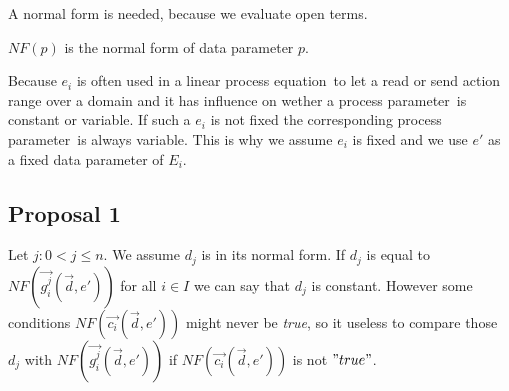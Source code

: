 \documentclass[a4paper,10pt]{article}
\newcommand{\lpe}{linear process equation}
\newcommand{\ovr}{\overrightarrow}
\newcommand{\pp}{process parameter}
\newcommand{\pps}{process parameters}
\newcommand{\ti}{\textit}
\begin{document}
A normal form is needed, because we evaluate open terms. 
\begin{defn} 
$NF(p)$ is the normal form of data parameter $p$. 
\end{defn}



Because $e_i$ is often used in a \lpe\ to let a read or send action range over a domain and it has influence on wether a \pp\ is constant or variable. If such a $e_i$ is not fixed the corresponding \pp\ is always variable.  This is why we assume $e_i$ is fixed and we use $e'$ as a fixed data parameter of $E_i$.

\subsection{Proposal 1} \label{sec:prop1}
Let $j : 0 < j \leqslant n $. We assume $d_j$ is in its normal form. If $d_j$ is equal to $NF(\ovr{g_i^j}(\ovr{d},e'))$ for all $i \in I$ we can say that $d_j$ is constant. However some conditions $NF(\ovr{c_i}(\ovr{d},e'))$ might never be \ti{true}, so it useless to compare those $d_j$ with $NF(\ovr{g_i^j}(\ovr{d},e'))$  if $NF(\ovr{c_i}(\ovr{d},e'))$ is not  $"true"$. \\
\end{document}
